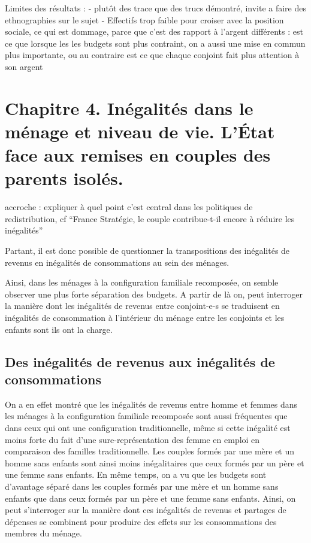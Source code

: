 \documentclass[
  12pt,
]{book}
\begin{document}
Limites des résultats : - plutôt des trace que des trucs démontré,
invite a faire des ethnographies sur le sujet - Effectifs trop faible
pour croiser avec la position sociale, ce qui est dommage, parce que
c'est des rapport à l'argent différents : est ce que lorsque les les
budgets sont plus contraint, on a aussi une mise en commun plus
importante, ou au contraire est ce que chaque conjoint fait plus
attention à son argent

\chapter{Chapitre 4. Inégalités dans le ménage et niveau de vie. L'État
face aux remises en couples des parents
isolés.}\label{chapitre-4.-inuxe9galituxe9s-dans-le-muxe9nage-et-niveau-de-vie.-luxe9tat-face-aux-remises-en-couples-des-parents-isoluxe9s.}

accroche : expliquer à quel point c'est central dans les politiques de
redistribution, cf ``France Stratégie, le couple contribue-t-il encore à
réduire les inégalités''

Partant, il est donc possible de questionner la transpositions des
inégalités de revenus en inégalités de consommations au sein des
ménages.

Ainsi, dans les ménages à la configuration familiale recomposée, on
semble observer une plus forte séparation des budgets. A partir de là
on, peut interroger la manière dont les inégalités de revenus entre
conjoint-e-s se traduisent en inégalités de consommation à l'intérieur
du ménage entre les conjoints et les enfants sont ils ont la charge.

\section{Des inégalités de revenus aux inégalités de
consommations}\label{des-inuxe9galituxe9s-de-revenus-aux-inuxe9galituxe9s-de-consommations}

On a en effet montré que les inégalités de revenus entre homme et femmes
dans les ménages à la configuration familiale recomposée sont aussi
fréquentes que dans ceux qui ont une configuration traditionnelle, même
si cette inégalité est moins forte du fait d'une sure-représentation des
femme en emploi en comparaison des familles traditionnelle. Les couples
formés par une mère et un homme sans enfants sont ainsi moins
inégalitaires que ceux formés par un père et une femme sans enfants. En
même temps, on a vu que les budgets sont d'avantage séparé dans les
couples formés par une mère et un homme sans enfants que dans ceux
formés par un père et une femme sans enfants. Ainsi, on peut
s'interroger sur la manière dont ces inégalités de revenus et partages
de dépenses se combinent pour produire des effets sur les consommations
des membres du ménage.
\end{document}
